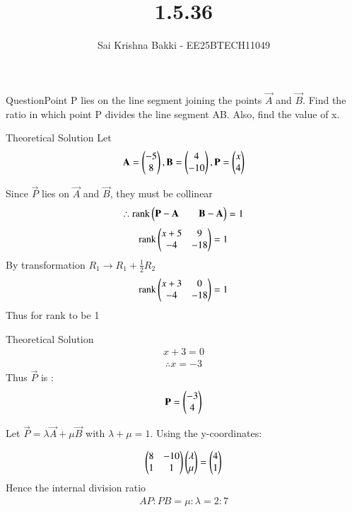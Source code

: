 \documentclass{beamer}
\title %
{1.5.36}
\date{}
\author %
{Sai Krishna Bakki - EE25BTECH11049}
\begin{document}
\frame{\titlepage}
\begin{frame}{Question}Point P lies on the line segment joining the points $\vec{A}$ and $\vec{B}$. Find the ratio in which point P divides the line segment AB. Also, find the value of x.
\end{frame}
\begin{frame}{Theoretical Solution}
Let 
\begin{align}
\mathbf{A}= \begin{pmatrix}-5 \\ 8\end{pmatrix}, \mathbf{B}= \begin{pmatrix}4 \\ -10\end{pmatrix} , \mathbf{P} = \begin{pmatrix}x \\ 4\end{pmatrix}
\end{align}    

Since $\vec{P}$ lies on $\vec{A}$ and $\vec{B}$, they must be collinear
\begin{align}
\therefore \text{rank}\begin{pmatrix}\mathbf{P} - \mathbf{A} & &\mathbf{B} - \mathbf{A}\end{pmatrix} = 1
\end{align}
\begin{align}
    \text{rank}\begin{pmatrix}x+5 & 9 \\ -4 & -18\end{pmatrix} = 1
\end{align}
By transformation $R_1 \rightarrow R_1 + \frac{1}{2}R_2$
\begin{align}
    \text{rank}\begin{pmatrix}x+3 & 0 \\ -4 & -18\end{pmatrix} = 1
\end{align}
Thus for rank to be 1
\end{frame}
\begin{frame}{Theoretical Solution}
 \begin{align}
    x+3 = 0
\end{align}
\begin{align}
\therefore x = -3
\end{align}
Thus $\vec{P}$ is :
\begin{align}
    \mathbf{P} = \begin{pmatrix}-3 \\ 4\end{pmatrix}
\end{align}

Let $\vec{P} = \lambda\vec{A} + \mu\vec{B}$ with $\lambda + \mu =1$. Using the y-coordinates:

\begin{align}
    \begin{pmatrix}8 & -10 \\ 1 & 1\end{pmatrix} \begin{pmatrix}\lambda \\ \mu\end{pmatrix} = \begin{pmatrix}4 \\ 1\end{pmatrix}
\end{align}
Hence the internal division ratio
\begin{align}
    AP:PB = \mu:\lambda=2:7
\end{align}
\end{frame}
\end{document}
